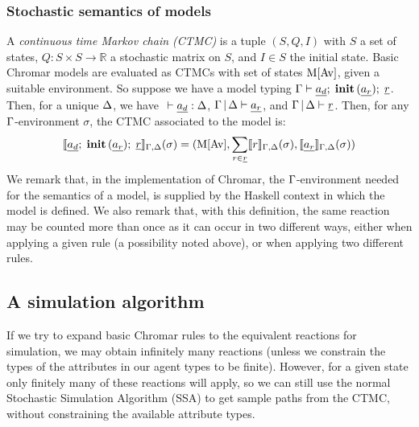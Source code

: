 \subsubsection*{Stochastic semantics of models}
\label{sec:stoch}
A \emph{continuous time Markov chain (CTMC)} is a tuple $(S, Q, I)$ with $S$ a
set of states, $Q: S \times S \rightarrow \mathbb{R}$ a stochastic matrix on
$S$, and $I \in S$ the initial state.  Basic Chromar models are evaluated as CTMCs
with set of states $\mathrm{M}[\mathrm{Av}]$, given a suitable environment.
%
So suppose we have a model typing 
$\Gamma \vdash \underline{a_d}; \; \mathbf{init}\, (\underline{a_r}); \; \underline{r}$. Then, for a unique $\Delta$, we have $\ \vdash \underline{a_d}: \Delta$, $\Gamma \,|\, \Delta \vdash \underline{a_r}$, and $\Gamma \,|\, \Delta \vdash \underline{r}$. 
%
Then, for any $ \Gamma$-environment $\sigma$,  the CTMC associated to the model is:
%
\[\llbracket  \underline{a_d}; \; \mathbf{init}\, (\underline{a_r}); \; \underline{r} \rrbracket_{\Gamma,\Delta}(\sigma) = (\mathrm{M}[\mathrm{Av}], \sum_{r \in \underline{r}} \llbracket r \rrbracket_{\Gamma,\Delta}(\sigma), \llbracket \underline{a_r} \rrbracket_{\Gamma,\Delta}(\sigma))\]
%
We remark that, in the implementation of Chromar, the $ \Gamma$-environment needed
for the semantics of a model, is supplied by the Haskell context in which the
model is defined. We also remark that, with this definition, the same reaction
may be counted more than once as it can occur in two different ways, either when
applying a given rule (a possibility noted above), or when applying two
different rules.

\subsection{A simulation algorithm}
If we try to expand basic Chromar rules to the equivalent reactions for
simulation, we may obtain infinitely many reactions (unless we constrain the
types of the attributes in our agent types to be finite). However, for a given
state only finitely many of these reactions will apply, so we can still use the
normal Stochastic Simulation Algorithm (SSA) to get sample paths from the CTMC,
without constraining the available attribute types.

